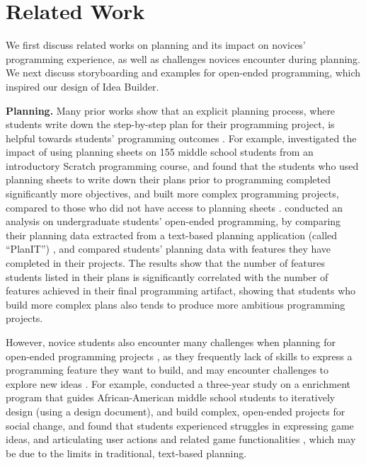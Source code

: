 \section{Related Work}

We first discuss related works on planning and its impact on novices' programming experience, as well as challenges novices encounter during planning. We next discuss storyboarding and examples for open-ended programming, which inspired our design of Idea Builder. 

\textbf{Planning.}
Many prior works show that an explicit planning process, where students write down the step-by-step plan for their programming project, is helpful towards students' programming outcomes \cite{jin2014evaluation, gonzalez2022investigating}. For example, \citeauthor{gonzalez2022investigating} investigated the impact of using planning sheets on 155 middle school students from an introductory Scratch programming course, and found that the students who used planning sheets to write down their plans prior to programming completed significantly more objectives, and built more complex programming projects, compared to those who did not have access to planning sheets \cite{gonzalez2022investigating}.  \citeauthor{wang2022exploring} conducted an analysis on undergraduate students' open-ended programming, by comparing their planning data extracted from a text-based planning application (called ``PlanIT'') \cite{milliken2021planit}, and compared students' planning data with features they have completed in their projects. The results show that the number of features students listed in their plans is significantly correlated with the number of features achieved in their final programming artifact, showing that students who build more complex plans also tends to produce more ambitious programming projects.

However, novice students also encounter many challenges when planning for open-ended programming projects \cite{wang2021novices, thomas2017exploring}, as they frequently lack of skills to express a programming feature they want to build, and may encounter challenges to explore new ideas \cite{wang2021novices}. For example, \citeauthor{thomas2017exploring} conducted a three-year study on a enrichment program that guides African-American middle school students to iteratively design (using a design document), and build complex, open-ended projects for social change, and found that students experienced struggles in expressing game ideas, and articulating user actions and related game functionalities \cite{thomas2017exploring}, which may be due to the limits in traditional, text-based planning. 




